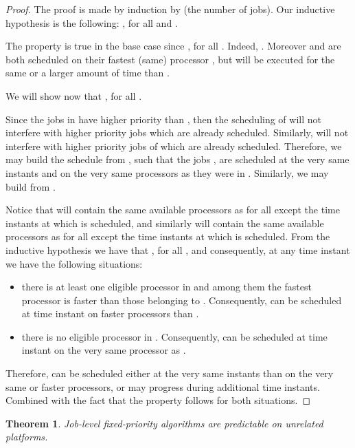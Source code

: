 \documentclass[a4paper,11pt]{article}
\newtheorem{Theorem}{Theorem}
\begin{document}
\begin{proof}
  The proof is made by induction by  (the number of jobs).  Our
  inductive hypothesis is the following: , for all  and .
 
  The property is true in the base case since , for all . Indeed, . Moreover  and  are both scheduled on
  their fastest (same) processor , but  will
  be executed for the same or a larger amount of time than .

  We will show now that , for all .

  Since the jobs in  have higher priority than , then
  the scheduling of  will not interfere with higher priority jobs
  which are already scheduled. Similarly,  will not
  interfere with higher priority jobs of  which are
  already scheduled. Therefore, we may build the schedule
   from , such that the jobs , are scheduled at the very same instants and on the
  very same processors as they were in . Similarly, we
  may build  from .

  Notice that  will contain the same available
  processors as  for all  except the time instants at
  which  is scheduled, and similarly 
  will contain the same available processors as  for
  all  except the time instants at which  is
  scheduled. From the inductive hypothesis we have that
  , for all , and
  consequently, at any time instant  we have the following
  situations:

  \begin{itemize}
  \item there is at least one eligible processor in  and among them the fastest processor
    is faster than those belonging to . Consequently,
     can be scheduled at time instant  on faster
    processors than .
  \item there is no eligible processor in . Consequently,  can be scheduled at time
    instant  on the very same processor as .
 \end{itemize}

 Therefore,  can be scheduled either at the very same instants
 than  on the very same or faster processors, or may
 progress during additional time instants. Combined with the fact that
  the property follows for both situations.
\end{proof}

\begin{Theorem} \label{thNotWorkPred} Job-level fixed-priority algorithms are predictable on unrelated platforms.
\end{Theorem}
\end{document}
